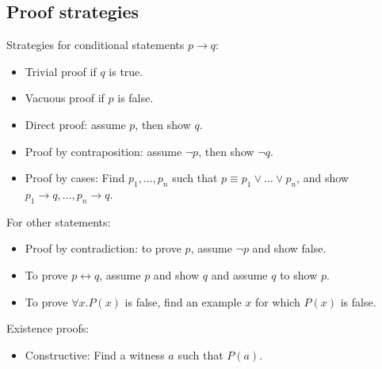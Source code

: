\subsection{Proof strategies}
Strategies for conditional statements \(p \rightarrow q\):
\begin{itemize}
    \item Trivial proof if \(q\) is true.
    \item Vacuous proof if \(p\) is false.
    \item Direct proof: assume \(p\), then show \(q\).
    \item Proof by contraposition: assume \(\neg p\), then show \(\neg q\).
    \item Proof by cases: Find \(p_1, \dots, p_n\) such that \(p \equiv p_1 \lor \dots \lor p_n\), and show \(p_1 \rightarrow q, \dots, p_n \rightarrow q\).
\end{itemize}
For other statements:
\begin{itemize}
    \item Proof by contradiction: to prove \(p\), assume \(\neg p\) and show false.
    \item To prove \(p \leftrightarrow q\), assume \(p\) and show \(q\) and assume \(q\) to show \(p\).
    \item To prove \(\forall x. P(x)\) is false, find an example \(x\) for which \(P(x)\) is false.
\end{itemize}
Existence proofs:
\begin{itemize}
    \item Constructive: Find a witness \(a\) such that \(P(a)\).
\end{itemize}
